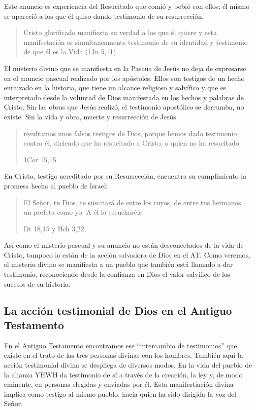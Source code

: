 Este anuncio es experiencia del Resucitado que comió y bebió con ellos; él mismo se apareció a los que él quiso dando testimonio de su resurrección. \blockquote[{\cite[129]{prades2015testimonio}}]{Cristo glorificado manifiesta su verdad a los que él quiere y esta manifestación es simultaneamente testimonio de su identidad y testimonio de que él es la Vida (1Jn 5,11)}

El misterio divino que se manifiesta en la Pascua de Jesús no deja de expresarse en el anuncio pascual realizado por los apóstoles. Ellos son testigos de un hecho enraizado en la historia, que tiene un alcance religioso y salvífico y que es interpretado desde la voluntad de Dios manifestada en los hechos y palabras de Cristo. Sin las obras que Jesús realizó, el testimonio apostólico se derrumba, no existe.\autocite[Cf.][1529]{latourelle2000testimonio} Sin la vida y obra, muerte y resurrección de Jesús \blockquote[1Cor 15,15]{resultamos unos falsos testigos de Dios, porque hemos dado testimonio contra él, diciendo que ha resucitado a Cristo, a quien no ha resucitado}.

En Cristo, testigo acreditado por su Resurrección, encuentra su cumplimiento la promesa hecha al pueblo de Israel: \blockquote[Dt 18,15 y Hch 3,22; {\cite[Cf.~][24ss]{ratzinger2007jdenaz}}]{El Señor, tu Dios, te suscitará de entre los tuyos, de entre tus hermanos, un profeta como yo. A él lo escucharéis}. Así como el misterio pascual y su anuncio no están desconectados de la vida de Cristo, tampoco lo están de la acción salvadora de Dios en el AT. Como veremos, el misterio divino se manifiesta a un pueblo que también está llamado a dar testimonio, reconociendo desde la confianza en Dios el valor salvífico de los sucesos de su historia.

\subsection{La acción testimonial de Dios en el Antiguo Testamento}

En el Antiguo Testamento encontramos ese \enquote{intercambio de testimonios} que existe en el trato de las tres personas divinas con los hombres.\autocite[Cf.][1531]{latourelle2000testimonio} También aquí la acción testimonial divina se despliega de diversos modos. En la vida del pueblo de la alianza YHWH da testimonio de sí a través de la creación, la ley y, de modo eminente, en personas elegidas y enviadas por él.\autocite[Cf.][114s]{prades2015testimonio} Esta manifestiación divina implica como testigo al mismo pueblo, hacia quien ha sido dirigida la voz del Señor.

